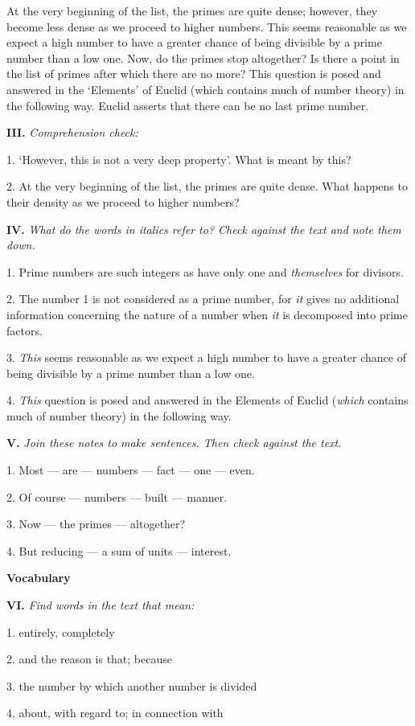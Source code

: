 \documentclass[a4paper]{article}
\newcommand{\ESect}[1]{\medskip\par{\large \textbf{#1}}\par}
\newcommand{\ETask}[2]{\medskip\par\textbf{#1.} \textit{#2}\par}
\begin{document}
At the very beginning of the list, the primes are quite dense; however, they become less dense as we proceed to higher numbers.
This seems reasonable as we expect a high number to have a greater chance of being divisible by a prime number than a low one.
Now, do the primes stop altogether? Is there a point in the list of primes after which there are no more? This question is posed
and answered in the `Elements' of Euclid (which contains much of number theory) in the following way. Euclid asserts that there
can be no last prime number.

\ETask{III}{Comprehension check:}
1. `However, this is not a very deep property'. What is meant by this?

2. At the very beginning of the list, the primes are quite dense. What happens to their density as we proceed to higher numbers?

\ETask{IV}{What do the words in italics refer to? Check against the text and note them down.}

1. Prime numbers are such integers as have only one and \textit{themselves} for divisors.

2. The number 1 is not considered as a prime number, for \textit{it} gives no additional information concerning the nature
of a number when \textit{it} is decomposed into prime factors.

3. \textit{This} seems reasonable as we expect a high number to have a greater chance of being divisible by a prime number
than a low one.

4. \textit{This} question is posed and answered in the Elements of Euclid (\textit{which} contains much of number theory)
in the following way.

\ETask{V}{Join these notes to make sentences. Then check against the text.}

1. Most --- are --- numbers --- fact --- one --- even.

2. Of course --- numbers --- built --- manner.

3. Now --- the primes --- altogether?

4. But reducing --- a sum of units --- interest.

\ESect{Vocabulary}

\ETask{VI}{Find words in the text that mean:}
1. entirely, completely

2. and the reason is that; because

3. the number by which another number is divided

4. about, with regard to; in connection with
\end{document}
